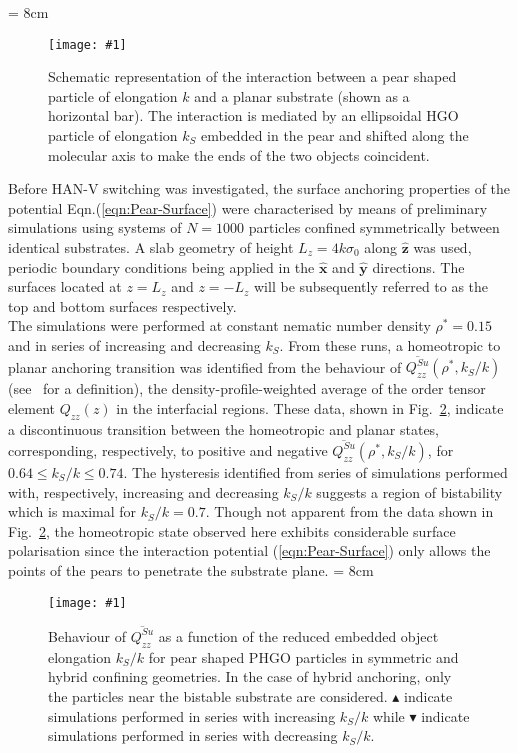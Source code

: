 \documentclass[aps,10pt,twocolumn]{revtex4}
\newcommand{\vecth}[1]{ \mathbf{\hat{#1} } }
\newlength{\picW}   %
\newcommand{\picA}{270} %
\newcommand{\pic}[1]{\texttt{[image: \#1]}}
\newcommand{\picL}[1]{\texttt{[image: \#1]}}
\begin{document}
\picW = 8cm
\begin{figure}
    \centering
    \pic{fig_01.ps}
    \caption{Schematic representation of the interaction between a pear shaped particle of elongation $k$
    and a planar substrate (shown as a horizontal bar). The interaction is mediated by an ellipsoidal HGO particle of elongation $k_S$ embedded
    in the pear and shifted along the molecular axis to make the ends of the two objects
    coincident.}
    \label{fig:PSUConfig}
\end{figure}

Before HAN-V switching was investigated, the surface anchoring properties of the potential
Eqn.(\ref{eqn:Pear-Surface}) were characterised by means of preliminary simulations using systems of $N=1000$
particles confined symmetrically between identical substrates. A slab geometry of height $L_z=4k\sigma_0$ along
$\vecth{z}$ was used, periodic boundary conditions being applied in the $\vecth{x}$ and $\vecth{y}$ directions.
The surfaces located at $z=L_z$ and $z=-L_z$ will be subsequently referred to as the top and
bottom surfaces respectively.\\
The simulations were performed at constant nematic number density $\rho^{*}=0.15$ and in series of increasing and
decreasing $k_S$. From these runs, a homeotropic to planar anchoring transition was identified from the behaviour
of $\overline{Q^{Su}_{zz}}(\rho^{*},k_S/k)$ (see~\cite{BarmesCleaver04a} for a definition), the
density-profile-weighted average of the order tensor element $Q_{zz}(z)$ in the interfacial regions. These data,
shown in Fig.~\ref{fig:QzzWa_SH}, indicate a discontinuous transition between the homeotropic and planar states,
corresponding, respectively, to positive and negative $\overline{Q^{Su}_{zz}}(\rho^{*},k_S/k)$, for $0.64\leq
k_S/k \leq 0.74$. The hysteresis identified from series of simulations performed with, respectively, increasing
and decreasing $k_S/k$ suggests a region of bistability which is maximal for $k_S/k=0.7$. Though not apparent from
the data shown in Fig.~\ref{fig:QzzWa_SH}, the homeotropic state observed here exhibits considerable surface
polarisation since the interaction potential (\ref{eqn:Pear-Surface}) only allows the points of the pears to
penetrate the substrate plane.
\picW = 8cm
\begin{figure}
    \centering
    \picL{fig_02.ps}
    \caption{Behaviour of $\overline{Q^{Su}_{zz}}$ as a function of the reduced embedded object
    elongation $k_S/k$ for pear shaped PHGO particles in symmetric and hybrid confining
    geometries. In the case of hybrid anchoring, only the particles near the bistable substrate are
    considered. $\blacktriangle$ indicate simulations performed in series with increasing $k_S/k$ while
    $\blacktriangledown$ indicate simulations performed in series with decreasing $k_S/k$.}
    \label{fig:QzzWa_SH}
\end{figure}
\end{document}
